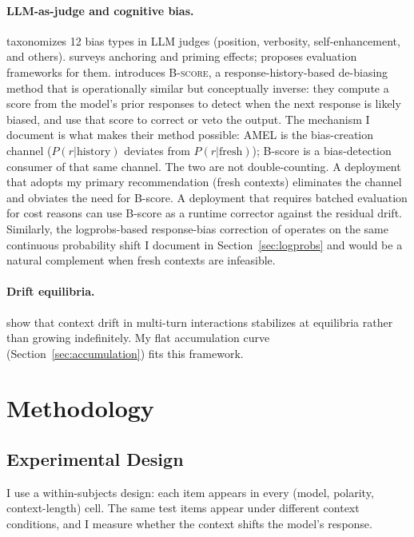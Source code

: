 \documentclass[10pt,twocolumn]{article}
\begin{document}
\paragraph{LLM-as-judge and cognitive bias.}
\citet{wang2024justice} taxonomizes 12 bias types in LLM judges (position, verbosity, self-enhancement, and others).
\citet{cogbias2024survey} surveys anchoring and priming effects; \citet{cbeval2024} proposes evaluation frameworks for them.
\citet{bscore2025} introduces \textsc{B-score}, a response-history-based de-biasing method that is operationally similar but conceptually inverse: they compute a score from the model's prior responses to detect when the next response is likely biased, and use that score to correct or veto the output.
The mechanism I document is what makes their method possible: AMEL is the bias-creation channel ($P(r|\text{history})$ deviates from $P(r|\text{fresh})$); B-score is a bias-detection consumer of that same channel.
The two are not double-counting. A deployment that adopts my primary recommendation (fresh contexts) eliminates the channel and obviates the need for B-score. A deployment that requires batched evaluation for cost reasons can use B-score as a runtime corrector against the residual drift.
Similarly, the logprobs-based response-bias correction of \citet{bhatt2026rbcorr} operates on the same continuous probability shift I document in Section~\ref{sec:logprobs} and would be a natural complement when fresh contexts are infeasible.

\paragraph{Drift equilibria.}
\citet{dongre2025drift} show that context drift in multi-turn interactions stabilizes at equilibria rather than growing indefinitely.
My flat accumulation curve (Section~\ref{sec:accumulation}) fits this framework.


\section{Methodology}
\label{sec:method}

\subsection{Experimental Design}

I use a within-subjects design: each item appears in every (model, polarity, context-length) cell.
The same test items appear under different context conditions, and I measure whether the context shifts the model's response.
\end{document}
